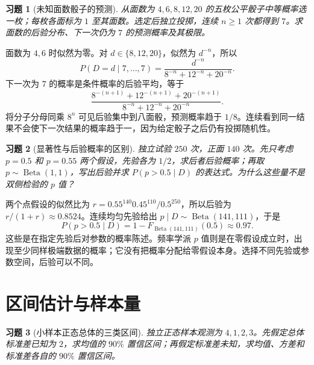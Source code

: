 \documentclass[12pt,fontset=fandol]{ctexart}
\newtheorem{exercise}{习题}[section]
\begin{document}
\begin{exercise}[未知面数骰子的预测]\label{q:M-P7-2}
从面数为 $4,6,8,12,20$ 的五枚公平骰子中等概率选一枚；每枚各面标为 $1$ 至其面数。选定后独立投掷，连续 $n\ge1$ 次都得到 $7$。求面数的后验分布、下一次仍为 $7$ 的预测概率及其极限。\par{}
\end{exercise}

\begin{solve}\label{a:M-P7-2}面数为 $4,6$ 时似然为零。对 $d\in\{8,12,20\}$，似然为 $d^{-n}$，所以\[P(D=d\mid7,\ldots,7)=\frac{d^{-n}}{8^{-n}+12^{-n}+20^{-n}}.\]下一次为 $7$ 的概率是条件概率的后验平均，等于\[\frac{8^{-(n+1)}+12^{-(n+1)}+20^{-(n+1)}}{8^{-n}+12^{-n}+20^{-n}}.\]将分子分母同乘 $8^n$ 可见后验集中到八面骰，预测概率趋于 $1/8$。连续看到同一结果不会使下一次结果的概率趋于一，因为给定骰子之后仍有投掷随机性。\end{solve}

\begin{exercise}[显著性与后验概率的区别]\label{q:M-P8-1fg}
独立试验 $250$ 次，正面 $140$ 次。先只考虑 $p=0.5$ 和 $p=0.55$ 两个假设，先验各为 $1/2$，求后者后验概率；再取 $p\sim\operatorname{Beta}(1,1)$，写出后验并求 $P(p>0.5\mid D)$ 的表达式。为什么这些量不是双侧检验的 $p$ 值？\par{}
\end{exercise}

\begin{solve}\label{a:M-P8-1fg}两个点假设的似然比为 $r=0.55^{140}0.45^{110}/0.5^{250}$，所以后验为 $r/(1+r)\approx0.8524$。连续均匀先验给出 $p\mid D\sim\operatorname{Beta}(141,111)$，于是\[P(p>0.5\mid D)=1-F_{\operatorname{Beta}(141,111)}(0.5)\approx0.97.\]这些是在指定先验后对参数的概率陈述。频率学派 $p$ 值则是在零假设成立时，出现至少同样极端数据的概率；它没有把概率分配给零假设本身。选择不同先验或参数空间，后验可以不同。\end{solve}

\clearpage\section{区间估计与样本量}

\begin{exercise}[小样本正态总体的三类区间]\label{q:M-C22-1}
独立正态样本观测为 $4,1,2,3$。先假定总体标准差已知为 $2$，求均值的 $90\%$ 置信区间；再假定标准差未知，求均值、方差和标准差各自的 $90\%$ 置信区间。\par{}
\end{exercise}
\end{document}
